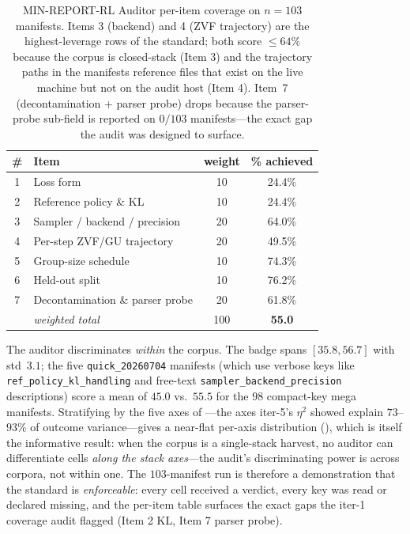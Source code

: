 \begin{table}[t]
\centering
\caption{MIN-REPORT-RL Auditor per-item coverage on $n=103$ manifests.
Items 3 (backend) and 4 (ZVF trajectory) are the highest-leverage
rows of the standard; both score $\le 64\%$ because the corpus is
closed-stack (Item 3) and the trajectory paths in the manifests
reference files that exist on the live machine but not on the audit
host (Item 4). Item~7 (decontamination + parser probe) drops because
the parser-probe sub-field is reported on $0/103$ manifests---the
exact gap the audit was designed to surface.}
\label{tab:p5-auditor-peritem}
\small
\begin{tabular}{@{}clcc@{}}
\toprule
\# & Item & weight & \% achieved \\
\midrule
1 & Loss form                          & 10  & 24.4\% \\
2 & Reference policy \& KL             & 10  & 24.4\% \\
3 & Sampler / backend / precision      & 20  & 64.0\% \\
4 & Per-step ZVF/GU trajectory         & 20  & 49.5\% \\
5 & Group-size schedule                & 10  & 74.3\% \\
6 & Held-out split                     & 10  & 76.2\% \\
7 & Decontamination \& parser probe    & 20  & 61.8\% \\
\midrule
   & \emph{weighted total}              & 100 & \textbf{55.0} \\
\bottomrule
\end{tabular}
\end{table}

The auditor discriminates \emph{within} the corpus. The badge spans
$[35.8, 56.7]$ with std~$3.1$; the five \texttt{quick\_20260704}
manifests (which use verbose keys like
\texttt{ref\_policy\_kl\_handling} and free-text
\texttt{sampler\_backend\_precision} descriptions) score a mean of
$45.0$ vs.\ $55.5$ for the $98$ compact-key mega manifests. Stratifying
by the five axes of ---the axes
iter-5's $\eta^{2}$ showed explain $73$--$93\%$ of outcome
variance---gives a near-flat per-axis distribution
(), which is itself the
informative result: when the corpus is a single-stack harvest, no
auditor can differentiate cells \emph{along the stack axes}---the
audit's discriminating power is across corpora, not within one. The
$103$-manifest run is therefore a demonstration that the standard is
\emph{enforceable}: every cell received a verdict, every key was read
or declared missing, and the per-item table surfaces the exact gaps
the iter-1 coverage audit flagged (Item 2 KL, Item 7 parser probe).

